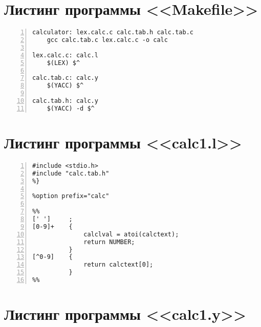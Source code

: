 \documentclass[bachelor, och, coursework, times]{SCWorks}
\begin{document}
%

%



\appendix

\section{Листинг программы <<Makefile>>}\label{pril-1}

\begin{Verbatim}[fontsize=\small, numbers=left]
calculator: lex.calc.c calc.tab.h calc.tab.c
	gcc calc.tab.c lex.calc.c -o calc

lex.calc.c: calc.l
	$(LEX) $^

calc.tab.c: calc.y
	$(YACC) $^

calc.tab.h: calc.y
	$(YACC) -d $^
\end{Verbatim}

\section{Листинг программы <<calc1.l>>}\label{pril-2}

\begin{Verbatim}[fontsize=\small, numbers=left]
%{
#include <stdio.h>
#include "calc.tab.h"
%}

%option prefix="calc"

%%
[' ']     ;
[0-9]+    {
              calclval = atoi(calctext);
              return NUMBER;
          }
[^0-9]    {             
              return calctext[0]; 
          }
%%
\end{Verbatim}

\section{Листинг программы <<calc1.y>>}\label{pril-3}
\end{document}
